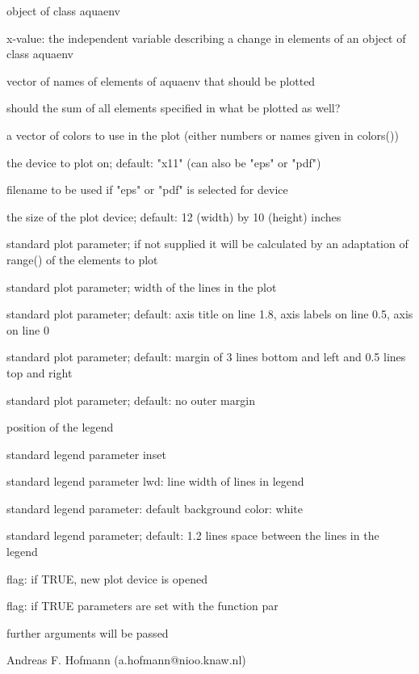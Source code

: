 \documentclass{article}
\begin{document}
\begin{Arguments}
\begin{ldescription}
\item[\code{aquaenv }] object of class aquaenv
\item[\code{xval }] x-value: the independent variable describing a change in elements of an object of class aquaenv
\item[\code{what }] vector of names of elements of aquaenv that should be plotted
\item[\code{total }] should the sum of all elements specified in what be plotted as well?
\item[\code{palette }] a vector of colors to use in the plot (either numbers or names given in colors())
\item[\code{device }] the device to plot on;       default: "x11" (can also be "eps" or "pdf")
\item[\code{filename }] filename to be used if "eps" or "pdf" is selected for device
\item[\code{size }] the size of the plot device; default: 12 (width) by 10 (height) inches
\item[\code{ylim }] standard plot parameter; if not supplied it will be calculated by an adaptation of range() of the elements to plot
\item[\code{lwd }] standard plot parameter; width of the lines in the plot
\item[\code{mgp }] standard plot parameter; default: axis title on line 1.8, axis labels on line 0.5, axis on line 0
\item[\code{mar }] standard plot parameter; default: margin of 3 lines bottom and left and 0.5 lines top and right
\item[\code{oma }] standard plot parameter; default: no outer margin
\item[\code{legendposition }] position of the legend
\item[\code{legendinset }] standard legend parameter inset
\item[\code{legendlwd }] standard legend parameter lwd: line width of lines in legend
\item[\code{bg }] standard legend parameter: default background color: white
\item[\code{y.intersp }] standard legend parameter; default: 1.2 lines space
between the lines in the legend
\item[\code{newdevice}] flag: if TRUE, new plot device is opened
\item[\code{setpar}] flag: if TRUE parameters are set with the function par
\item[\code{... }] further arguments will be passed
\end{ldescription}
\end{Arguments}
\begin{Author}\relax
Andreas F. Hofmann (a.hofmann@nioo.knaw.nl)
\end{Author}
\end{document}
